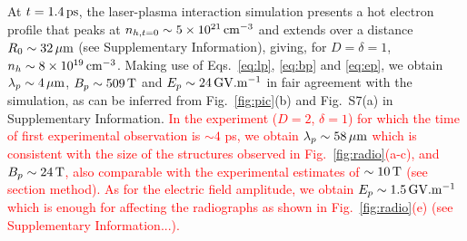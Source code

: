 \documentclass[aps,twocolumn,showpacs,superscriptaddress]{revtex4}
\begin{document}
%
At  $t = 1.4\,\rm ps$, the laser-plasma interaction simulation presents a hot electron profile that peaks at $n_{h, t=0} \sim 5\times 10^{21}\,\rm cm^{-3}$ and extends over a distance $R_0\sim 32\,\rm \mu m$ (see Supplementary Information), giving, for $D=\delta=1$, $n_h \sim 8 \times 10^{19}\,\rm cm^{-3}$.
Making use of Eqs.~\eqref{eq:lp}, \eqref{eq:bp} and \eqref{eq:ep}, we obtain $\lambda_p \sim 4 \,\rm \mu m$, $B_p \sim 509\,\rm T$ and $E_p\sim 24\,\rm GV.m^{-1}$ in fair agreement with the simulation, as can be inferred from Fig.~\ref{fig:pic}(b) and Fig.~S7(a) in Supplementary Information. 
\textcolor{red}{
In the experiment ($D=2$, $\delta=1$) for which the time of first experimental observation is $\sim 4$ ps, we obtain
$\lambda_p \sim 58 \,\rm \mu m$ which is consistent with the size of the structures observed in Fig.~\ref{fig:radio}(a-c), and   $B_p\sim 24\,\rm T$, also comparable with the experimental estimates of $\sim 10\,\rm T$ (see section method). As for the electric field amplitude, we obtain $E_p \sim 1.5\,\rm GV.m^{-1}$ which is enough for affecting  the radiographs as shown in Fig.~\ref{fig:radio}(e) (see Supplementary Information...).
}
\end{document}
